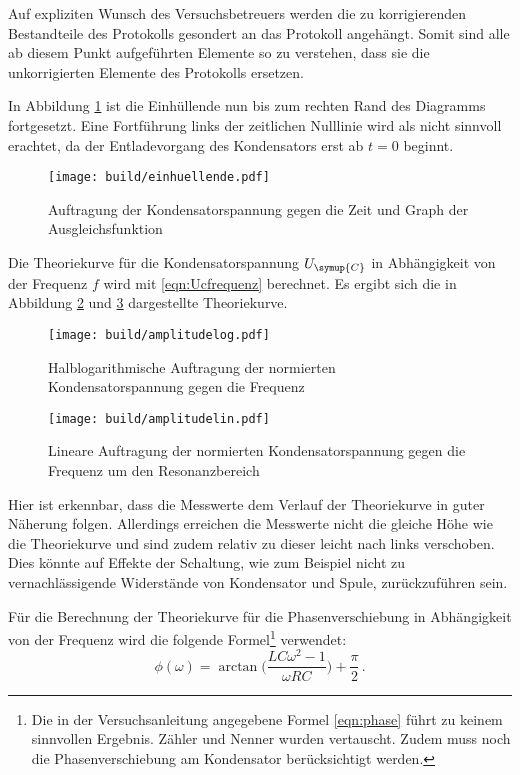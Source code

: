 \newpage
Auf expliziten Wunsch des Versuchsbetreuers werden die zu korrigierenden Bestandteile
des Protokolls gesondert an das Protokoll angehängt. Somit sind alle ab diesem Punkt
aufgeführten Elemente so zu verstehen, dass sie die unkorrigierten Elemente des
Protokolls ersetzen.

\newpage
{}
\label{sec:Korrektur}

In Abbildung \ref{fig:einhuellendefit} ist die Einhüllende nun bis zum rechten Rand
des Diagramms fortgesetzt. Eine Fortführung links der zeitlichen Nulllinie wird
als nicht sinnvoll erachtet, da der Entladevorgang des Kondensators erst ab $t=0$
beginnt.

\begin{figure}
  \centering
  \texttt{[image: build/einhuellende.pdf]}
  \caption{Auftragung der Kondensatorspannung gegen die Zeit und Graph der Ausgleichsfunktion}
  \label{fig:einhuellendefit}
\end{figure}

Die Theoriekurve für die Kondensatorspannung $U_{\symup{C}}$ in Abhängigkeit
von der Frequenz $f$ wird mit \eqref{eqn:Ucfrequenz} berechnet. Es ergibt sich die
in Abbildung \ref{fig:amplitudelog2} und \ref{fig:amplitudelin2} dargestellte
Theoriekurve.

\begin{figure}
  \centering
  \texttt{[image: build/amplitudelog.pdf]}
  \caption{Halblogarithmische Auftragung der normierten Kondensatorspannung
  gegen die Frequenz}
  \label{fig:amplitudelog2}
\end{figure}

\begin{figure}
  \centering
  \texttt{[image: build/amplitudelin.pdf]}
  \caption{Lineare Auftragung der normierten Kondensatorspannung gegen die
  Frequenz um den Resonanzbereich}
  \label{fig:amplitudelin2}
\end{figure}

Hier ist erkennbar, dass die Messwerte dem Verlauf der Theoriekurve in guter
Näherung folgen. Allerdings erreichen die Messwerte nicht die gleiche Höhe wie
die Theoriekurve und sind zudem relativ zu dieser leicht nach links verschoben.
Dies könnte auf Effekte der Schaltung, wie zum Beispiel nicht zu vernachlässigende
Widerstände von Kondensator und Spule, zurückzuführen sein.


Für die Berechnung der Theoriekurve für die Phasenverschiebung in Abhängigkeit
von der Frequenz wird die folgende Formel\footnote{Die in der Versuchsanleitung angegebene Formel \eqref{eqn:phase}
führt zu keinem sinnvollen Ergebnis. Zähler und Nenner wurden
vertauscht. Zudem muss noch die Phasenverschiebung am Kondensator berücksichtigt
werden.} verwendet:
\begin{equation}
  \phi(\omega)=\arctan\biggl(\frac{L C \omega^2-1}{\omega R C}\biggr)+\frac{\pi}{2}\,.
\end{equation}

